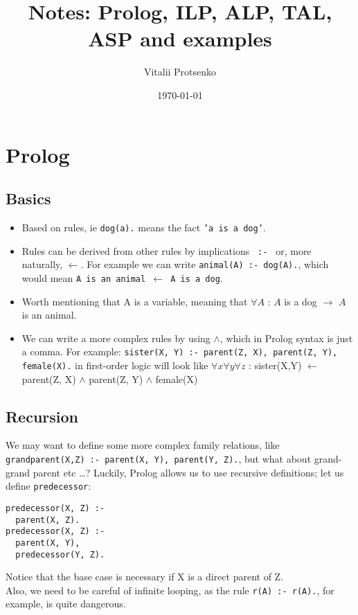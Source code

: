 \documentclass[11pt]{article}
\begin{document}
\title{Notes: Prolog, ILP, ALP, TAL, ASP and examples}

\author{Vitalii Protsenko}

\date{\today}         %

\maketitle

\section{Prolog}

\subsection{Basics}

\begin{itemize}
  \item Based on rules, ie \texttt{dog(a).} means the fact \texttt{'a is a dog'}.
  \item Rules can be derived from other rules by implications \texttt{ :- } or, more naturally,  $\leftarrow$. For example we can write \texttt{animal(A) :- dog(A).}, which would mean \texttt{A is an animal $\leftarrow$ A is a dog}.
  \item Worth mentioning that A is a variable, meaning that $\forall A$ : $A$ is a dog $\rightarrow$ $A$ is an animal.
  \item We can write a more complex rules by using $\wedge$, which in Prolog syntax is just a comma. For example: \texttt{sister(X, Y) :- parent(Z, X), parent(Z, Y), female(X).} in first-order logic will look like $\forall x \forall y \forall z$ : sister(X,Y) $\leftarrow$ parent(Z, X) $\wedge$ parent(Z, Y) $\wedge$ female(X)
\end{itemize}

\subsection{Recursion}
We may want to define some more complex family relations, like \texttt{grandparent(X,Z) :- parent(X, Y), parent(Y, Z).}, but what about grand-grand parent etc \ldots ? Luckily, Prolog allows us to use recursive definitions; let us define \texttt{predecessor}:
\begin{lstlisting}
predecessor(X, Z) :-
  parent(X, Z).
predecessor(X, Z) :-
  parent(X, Y),
  predecessor(Y, Z).
\end{lstlisting}
Notice that the base case is necessary if X is a direct parent of Z.\\Also, we need to be careful of infinite looping, as the rule \texttt{r(A) :- r(A).}, for example, is quite dangerous.
\end{document}
